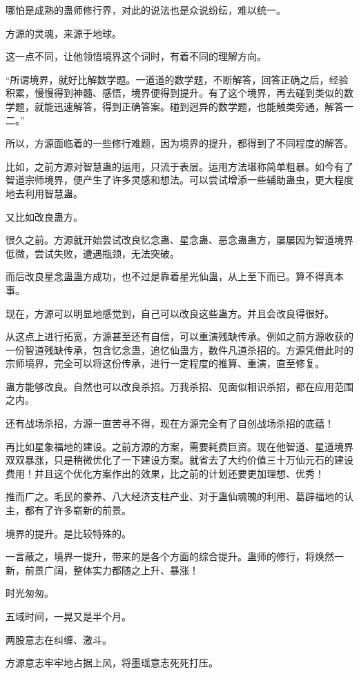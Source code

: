 \begin{this_body}
哪怕是成熟的蛊师修行界，对此的说法也是众说纷纭，难以统一。

方源的灵魂，来源于地球。

这一点不同，让他领悟境界这个词时，有着不同的理解方向。

“所谓境界，就好比解数学题。一道道的数学题，不断解答，回答正确之后，经验积累，慢慢得到神髓、感悟，境界便得到提升。有了这个境界，再去碰到类似的数学题，就能迅速解答，得到正确答案。碰到迥异的数学题，也能触类旁通，解答一二。”

所以，方源面临着的一些修行难题，因为境界的提升，都得到了不同程度的解答。

比如，之前方源对智慧蛊的运用，只流于表层。运用方法堪称简单粗暴。如今有了智道宗师境界，便产生了许多灵感和想法。可以尝试增添一些辅助蛊虫，更大程度地去利用智慧蛊。

又比如改良蛊方。

很久之前。方源就开始尝试改良忆念蛊、星念蛊、恶念蛊蛊方，屡屡因为智道境界低微，尝试失败，遭遇瓶颈，无法突破。

而后改良星念蛊蛊方成功，也不过是靠着星光仙蛊，从上至下而已。算不得真本事。

现在，方源可以明显地感觉到，自己可以改良这些蛊方。并且会改良得很好。

从这点上进行拓宽，方源甚至还有自信，可以重演残缺传承。例如之前方源收获的一份智道残缺传承，包含忆念蛊，追忆仙蛊方，数件凡道杀招的。方源凭借此时的宗师境界，完全可以将这份传承，进行一定程度的推算、重演，直至修复。

蛊方能够改良。自然也可以改良杀招。万我杀招、见面似相识杀招，都在应用范围之内。

还有战场杀招，方源一直苦寻不得，现在方源完全有了自创战场杀招的底蕴！

再比如星象福地的建设。之前方源的方案，需要耗费巨资。现在他智道、星道境界双双暴涨，只是稍微优化了一下建设方案。就省去了大约价值三十万仙元石的建设费用！并且这个优化方案作出的效果，比之前的计划还要更加理想、优秀！

推而广之。毛民的豢养、八大经济支柱产业、对于蛊仙魂魄的利用、葛辟福地的认主，都有了许多崭新的前景。

境界的提升。是比较特殊的。

一言蔽之，境界一提升，带来的是各个方面的综合提升。蛊师的修行，将焕然一新，前景广阔，整体实力都随之上升、暴涨！

时光匆匆。

五域时间，一晃又是半个月。

两股意志在纠缠、激斗。

方源意志牢牢地占据上风，将墨瑶意志死死打压。


\end{this_body}
